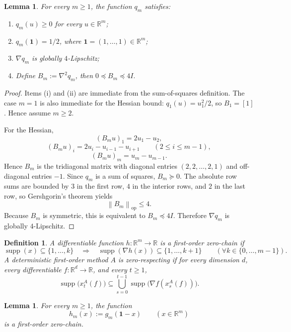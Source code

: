 \documentclass[11pt]{article}
\newtheorem{lemma}[theorem]{Lemma}
\newtheorem{definition}[theorem]{Definition}
\newcommand{\R}{\mathbb{R}}
\newcommand{\norm}[1]{\left\lVert #1\right\rVert}
\newcommand{\supp}{\operatorname{supp}}
\newcommand{\one}{\mathbf{1}}
\begin{document}
\begin{lemma}
\label{lem:q-basic}
For every $m\ge 1$, the function $q_m$ satisfies:
\begin{enumerate}[label=(\roman*),leftmargin=1.5em]
    \item $q_m(u)\ge 0$ for every $u\in\R^m$;
    \item $q_m(\one)=1/2$, where $\one=(1,\ldots,1)\in\R^m$;
    \item $\nabla q_m$ is globally $4$-Lipschitz;
    \item Define $B_m:=\nabla^2 q_m$, then
    $0\preceq B_m\preceq 4I.$
\end{enumerate}
\end{lemma}

	\begin{proof}
	Items (i) and (ii) are immediate from the sum-of-squares definition.
The case \(m=1\) is also immediate for the Hessian bound: \(q_1(u)=u_1^2/2\), so \(B_1=[1]\). Hence assume
\(m\ge2\).

	For the Hessian,
\[
(B_mu)_1=2u_1-u_2,
\]
\[
(B_mu)_i=2u_i-u_{i-1}-u_{i+1}
\qquad (2\le i\le m-1),
\]
\[
(B_mu)_m=u_m-u_{m-1}.
\]
Hence $B_m$ is the tridiagonal matrix with diagonal entries $(2,2,\ldots,2,1)$ and off-diagonal entries $-1$. Since $q_m$ is a sum of squares, $B_m\succeq 0$.
The absolute row sums are bounded by $3$ in the first row, $4$ in the interior rows, and $2$ in the last row, so Gershgorin's theorem yields
\[
\norm{B_m}_{\mathrm{op}}\le 4.
\]
Because $B_m$ is symmetric, this is equivalent to $B_m\preceq 4I$.
Therefore $\nabla q_m$ is globally $4$-Lipschitz.
\end{proof}

\begin{definition}
\label{def:zero-chain}
A differentiable function $h:\R^m\to\R$ is a \emph{first-order zero-chain} if
\[
\supp(x)\subseteq \{1,\ldots,k\}
\quad\Longrightarrow\quad
\supp(\nabla h(x))\subseteq \{1,\ldots,k+1\}
\qquad (\forall k\in\{0,\ldots,m-1\}).
\]
A deterministic first-order method $A$ is \emph{zero-respecting} if for every dimension $d$, every differentiable $f:\R^d\to\R$, and every $t\ge 1$,
\[
\supp\bigl(x_t^A(f)\bigr)
\subseteq
\bigcup_{s=0}^{t-1}\supp\bigl(\nabla f(x_s^A(f))\bigr).
\]
\end{definition}

\begin{lemma}
\label{lem:zero-chain}
For every $m\ge 1$, the function
\[
h_m(x):=g_m(\one-x)
\qquad (x\in\R^m)
\]
is a first-order zero-chain.
\end{lemma}
\end{document}
